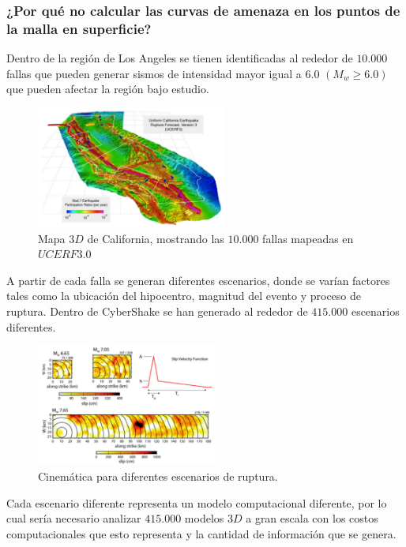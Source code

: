 \documentclass{beamer}
\begin{document}
\begin{frame}[allowframebreaks]
\frametitle{¿Por qué no calcular las curvas de amenaza en los puntos de la malla en superficie?}
%
\justifying
%
Dentro de la región de Los Angeles se tienen identificadas al rededor de $10.000$ fallas que pueden generar sismos de intensidad mayor igual a $6.0$ $(M_w \geq 6.0)$ que pueden afectar la región bajo estudio.
%
\begin{figure}[h]
	\centering
	\includegraphics[height=4cm]{img/UCERF3_Map.pdf}
	\caption{Mapa $3D$ de California, mostrando las $10.000$ fallas mapeadas en $UCERF3.0$ \cite[figura 1, página 5]{ucerf3}}
\end{figure}
%
A partir de cada falla se generan diferentes escenarios, donde se varían factores tales como la ubicación del hipocentro, magnitud del evento y proceso de ruptura. Dentro de CyberShake se han generado al rededor de $415.000$ escenarios diferentes.\\
%
\begin{figure}[h]
	\centering
	\includegraphics[height=4cm]{img/ModeloRuptura.pdf}
	\caption{Cinemática para diferentes escenarios de ruptura. \cite[figura 4, página 7]{gravesetal}}
\end{figure}
%
Cada escenario diferente representa un modelo computacional diferente, por lo cual sería necesario analizar $415.000$ modelos $3D$ a gran escala con los costos computacionales que esto representa y la cantidad de información que se genera.\\ 
%
%
\end{frame}
%
%
\end{document}
